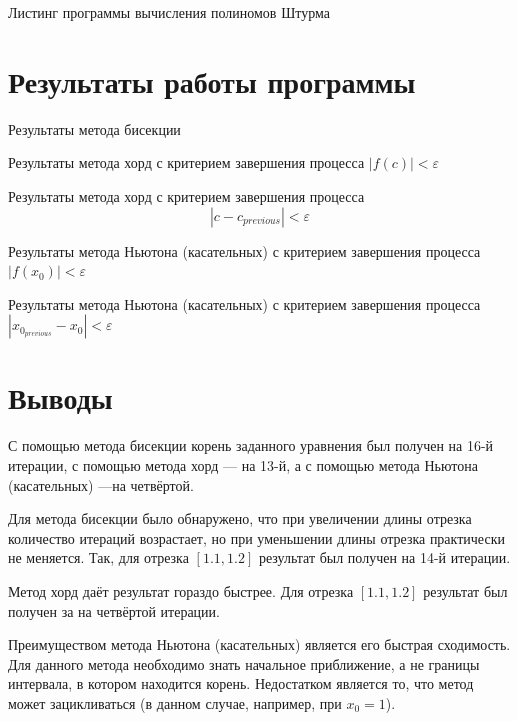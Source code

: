 Листинг программы вычисления полиномов Штурма
\lstset{inputencoding=utf8, extendedchars=\true}


\chapter{Результаты работы программы}

Результаты метода бисекции
\lstset{inputencoding=utf8, extendedchars=\true}


Результаты метода хорд с критерием завершения процесса $ \left| f \left( c \right) \right| < \varepsilon $
\lstset{inputencoding=utf8, extendedchars=\true}


Результаты метода хорд с критерием завершения процесса
$$\left| c - c_{previous} \right| < \varepsilon $$
\lstset{inputencoding=utf8, extendedchars=\true}


Результаты метода Ньютона (касательных) с критерием завершения процесса $ \left| f \left( x_0 \right) \right| < \varepsilon $
\lstset{inputencoding=utf8, extendedchars=\true}


Результаты метода Ньютона (касательных) с критерием завершения процесса $ \left| x_{0_{previous}} - x_0 \right| < \varepsilon $
\lstset{inputencoding=utf8, extendedchars=\true}


\chapter*{Выводы}

С помощью метода бисекции корень заданного уравнения был получен на 16-й итерации,
с помощью метода хорд --- на 13-й,
а с помощью метода Ньютона (касательных) ---на четвёртой.

Для метода бисекции было обнаружено, что при увеличении длины отрезка количество итераций возрастает, но при уменьшении длины отрезка практически не меняется.
Так, для отрезка $ \left[ 1.1, 1.2 \right] $ результат был получен на 14-й итерации.

Метод хорд даёт результат гораздо быстрее.
Для отрезка $ \left[ 1.1, 1.2 \right] $ результат был получен за на четвёртой итерации.

Преимуществом метода Ньютона (касательных) является его быстрая сходимость.
Для данного метода необходимо знать начальное приближение, а не границы интервала, в котором находится корень.
Недостатком является то, что метод может зацикливаться (в данном случае, например, при $x_0 = 1$).


